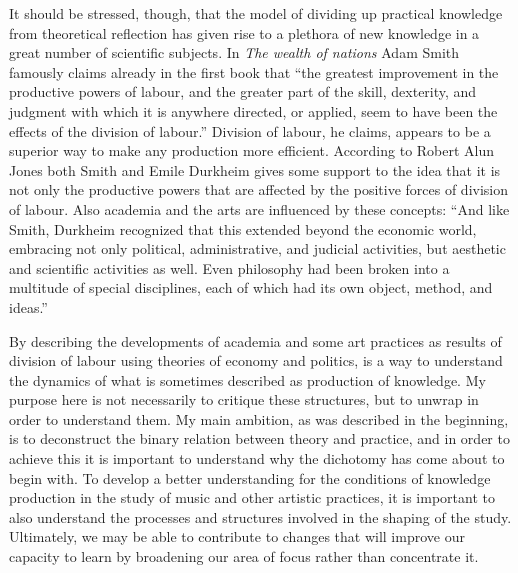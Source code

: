\documentclass[12pt]{article}
\begin{document}
It should be stressed, though, that the model of dividing up practical knowledge from theoretical reflection has given rise to a plethora of new knowledge in a great number of scientific subjects. In \emph{The wealth of nations} Adam Smith famously claims already in the first book that ``the greatest improvement in the productive powers of labour, and the greater part of the skill, dexterity, and judgment with which it is anywhere directed, or applied, seem to have been the effects of the division of labour.'' Division of labour, he claims, appears to be a superior way to make any production more efficient.
According to Robert Alun Jones both Smith and Emile Durkheim gives some support to the idea that it is not only the productive powers that are affected by the positive forces of division of labour. Also academia and the arts are influenced by these concepts: ``And like Smith, Durkheim recognized that this extended beyond the economic world, embracing not only political, administrative, and judicial activities, but aesthetic and scientific activities as well. Even philosophy had been broken into a multitude of special disciplines, each of which had its own object, method, and ideas.'' 

By describing the developments of academia and some art practices as results of division of labour using theories of economy and politics, is a way to understand the dynamics of what is sometimes described as production of knowledge. My purpose here is not necessarily to critique these structures, but to unwrap in order to understand them. My main ambition, as was described in the beginning, is to deconstruct the binary relation between theory and practice, and in order to achieve this it is important to understand why the dichotomy has come about to begin with. To develop a better understanding for the conditions of knowledge production in the study of music and other artistic practices, it is important to also understand the processes and structures involved in the shaping of the study. Ultimately, we may be able to contribute to changes that will improve our capacity to learn by broadening our area of focus rather than concentrate it.
\end{document}
